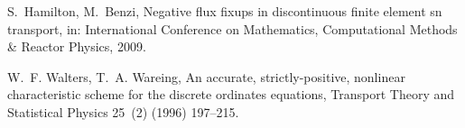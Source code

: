\documentclass[xchauthor,chkrefs,fixeqskip,GCNS,amsmath,amsthm]{yjcphg}
\theoremstyle{remark}
\begin{document}
\begin{backmatter}
\begin{thebibliography}{}
\begin{bsubitem}
\begin{bcontribution}%
\end{bcontribution}
\begin{bhost}
\begin{beditedbook}
\end{beditedbook}
\end{bhost}
\end{bsubitem}
%
\OrigBibText
S.~Hamilton, M.~Benzi, Negative flux fixups in discontinuous finite
element sn transport, in: International Conference on Mathematics,
Computational Methods \& Reactor Physics, 2009.
\endOrigBibText
{}%
\endbibitem

\begin{bsubitem}
\begin{bcontribution}%
\end{bcontribution}
\begin{bhost}
\begin{bissue}
\end{bissue}
\end{bhost}
\end{bsubitem}
%
\OrigBibText
W.~F. Walters, T.~A. Wareing, An accurate, strictly-positive, nonlinear
characteristic scheme for the discrete ordinates equations, Transport
Theory and Statistical Physics 25~(2) (1996) 197--215.
\endOrigBibText
{}%
\endbibitem


\end{thebibliography}
\end{backmatter}
\end{document}
